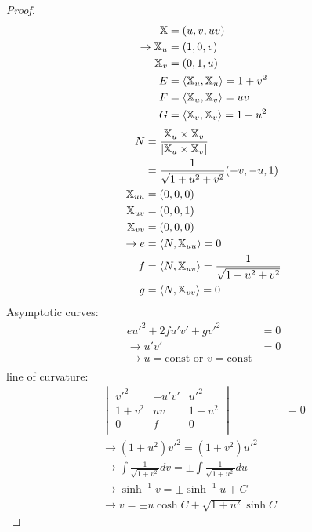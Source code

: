 \documentclass[10pt,a4paper]{article}
\begin{document}
\begin{proof}
\begin{align*}
\mathbb{X}&=(u,v,uv)\\
\rightarrow \mathbb{X}_u&=(1,0,v)\\
\mathbb{X}_v&=(0,1,u)\\
E&=\langle\mathbb{X}_u,\mathbb{X}_u\rangle=1+v^2\\
F&=\langle\mathbb{X}_u,\mathbb{X}_v\rangle=uv\\
G&=\langle\mathbb{X}_v,\mathbb{X}_v\rangle=1+u^2\\
\end{align*}
\begin{align*}
N&=\frac{\mathbb{X}_u\times\mathbb{X}_v}{|\mathbb{X}_u\times\mathbb{X}_v|}\\
&=\frac{1}{\sqrt{1+u^2+v^2}}(-v,-u,1)\\
\mathbb{X}_{uu}&=(0,0,0)\\
\mathbb{X}_{uv}&=(0,0,1)\\
\mathbb{X}_{vv}&=(0,0,0)\\
\rightarrow e&=\langle N,\mathbb{X}_{uu}\rangle=0\\
f&=\langle N,\mathbb{X}_{uv}\rangle=\frac{1}{\sqrt{1+u^2+v^2}}\\
g&=\langle N,\mathbb{X}_{vv}\rangle=0\\
\end{align*}
Asymptotic curves:\\
\begin{align*}
eu'^2+2fu'v'+gv'^2&=0\\
\rightarrow u'v'&=0\\
\rightarrow u=\textrm{const}\textrm{ or }v=\textrm{const}\\
\end{align*}
line of curvature:\\
\begin{align*}
\begin{vmatrix}
v'^2 & -u'v' & u'^2\\
1+v^2 & uv & 1+u^2\\
0 & f & 0\\
\end{vmatrix}&=0\\
\rightarrow (1+u^2)v'^2=(1+v^2)u'^2\\
\rightarrow \int\frac{1}{\sqrt{1+v^2}}dv=\pm\int\frac{1}{\sqrt{1+u^2}}du\\
\rightarrow \sinh^{-1}v=\pm\sinh^{-1}u+C\\
\rightarrow v=\pm u\cosh C+\sqrt{1+u^2}\sinh C
\end{align*}
\end{proof}
\end{document}
